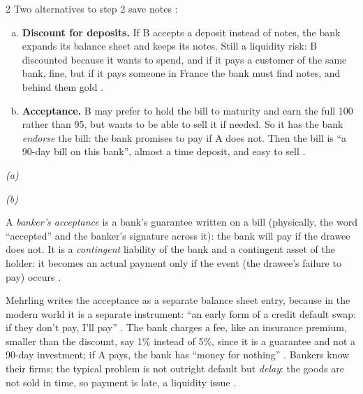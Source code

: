 \begin{paracol}{2}
Two alternatives to step 2 save notes :
\begin{enumerate}[(a)]
  \item \textbf{Discount for deposits.} If B accepts a deposit instead of notes, the bank expands its balance sheet and keeps its notes. Still a liquidity risk: B discounted
        because it wants to spend, and if it pays a customer of the same bank, fine, but if it pays someone in France the bank must find notes, and behind them gold
        .
  \item \textbf{Acceptance.} B may prefer to hold the bill to maturity and earn the full 100 rather than 95, but wants to be able to sell it if needed. So it has the bank
        \emph{endorse} the bill: the bank promises to pay if A does not. Then the bill is ``a 90-day bill on this bank'', almost a time deposit, and easy to sell
        .
\end{enumerate}
\begin{taccts}
\textit{(a)}\quad{}\quad
{}

\medskip
\textit{(b)}\quad{}\quad
{}
\end{taccts}

\begin{definition}
A \emph{banker's acceptance} is a bank's guarantee written on a bill (physically, the word ``accepted'' and the banker's signature across it): the bank will pay if the drawee does
not. It is a \emph{contingent} liability of the bank and a contingent asset of the holder: it becomes an actual payment only if the event (the drawee's failure to pay)
occurs .
\end{definition}

Mehrling writes the acceptance as a separate balance sheet entry, because in the modern world it is a separate instrument: ``an early form of a credit default swap: if they
don't pay, I'll pay'' . The bank charges a fee, like an insurance premium, smaller than the discount, say 1\% instead of 5\%, since it is a guarantee and
not a 90-day investment; if A pays, the bank has ``money for nothing'' . Bankers know their firms; the typical problem is not outright default
but \emph{delay}: the goods are not sold in time, so payment is late, a liquidity issue .


\end{paracol}
